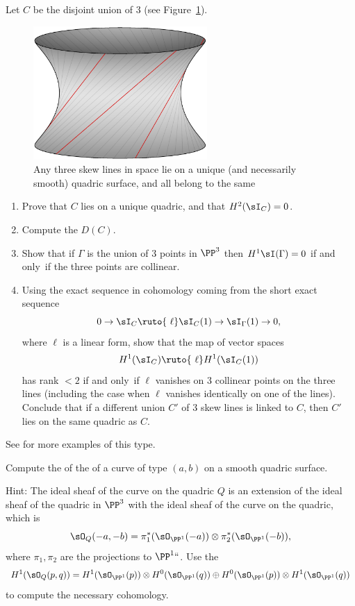 \begin{exercise}
Let $C$ be the disjoint union of 3 
%
(see Figure~\ref{Fig15.2}).

\begin{figure}[b]
\includegraphics[height=2in]{main/Fig15-2-SinglyRuledHyperboloid-good}
\caption{Any three skew lines in space lie on a unique 
(and necessarily 
smooth) quadric surface, and all belong to the same 
%
}
\label{Fig15.2}
\end{figure}

\begin{enumerate}
\item Prove that $C$ lies on a unique quadric, and that $H^2(\sI_C) = 0$.
%
\item Compute the 
 $D(C)$.
%
\item Show that if $\Gamma$ is the union of 3 points in $\PP^3$ then
$H^1\sI(\Gamma) = 0$ if and only~if the three points are collinear.
\item Using the exact sequence in cohomology coming from the short
exact sequence
$$
0\to \sI_C \ruto {\ \ell} \sI_C(1) \to \sI_\Gamma(1) \to 0 ,
$$
where $\ell$ is a linear form, show that the map of vector spaces
$$
H^1(\sI_C) \ruto {\ \ell} H^1(\sI_C(1))
$$
has rank $<2$ if and only~if $\ell$ vanishes on 3 collinear points on the
three lines (including the case when $\ell$ vanishes identically on one
of the lines).
Conclude that if a different union $C'$ of 3 skew lines is linked to $C$,
then $C'$ lies on the same quadric as $C$.
\end{enumerate}
See \cite{Migliore} for more examples of this type.
\end{exercise}

\begin{exercise}
Compute the 
%
of the 
%
 of a curve
of type $(a,b)$ on a smooth quadric surface.

Hint: The ideal sheaf of the curve on the quadric $Q$ is an extension
of the ideal sheaf of the quadric in $\PP^3$
with the ideal sheaf of the curve on the quadric, which is
$$
\sO_Q(-a,-b) = \pi_1^*(\sO_{\PP^1}(-a)) \otimes \pi_2^*(\sO_{\PP^1}(-b)),
$$
where $\pi_1, \pi_2$ are the projections to $\PP^1` `$. Use the
%
$$
H^1(\sO_Q(p,q)) = H^1(\sO_{\PP^1}(p)) \otimes H^0(\sO_{\PP^1}(q)) \oplus
H^0(\sO_{\PP^1}(p)) \otimes H^1(\sO_{\PP^1}(q))
$$
to compute the necessary cohomology.
\end{exercise}

